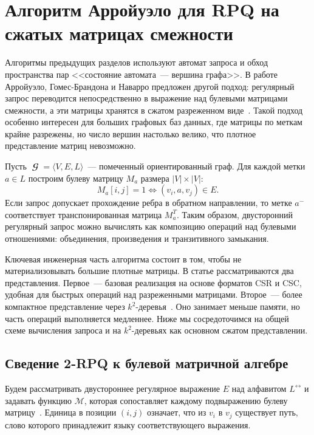 \section{Алгоритм Арройуэло для RPQ на сжатых матрицах смежности}
\label{sec:RPQ_Arroyuelo}

Алгоритмы предыдущих разделов используют автомат запроса и обход пространства пар <<состояние автомата~--- вершина графа>>. В работе Арройуэло, Гомес-Брандона и Наварро предложен другой подход: регулярный запрос переводится непосредственно в выражение над булевыми матрицами смежности, а эти матрицы хранятся в сжатом разреженном виде~. Такой подход особенно интересен для больших графовых баз данных, где матрицы по меткам крайне разрежены, но число вершин настолько велико, что плотное представление матриц невозможно.

Пусть $\mbfscrG = \langle V,E,L\rangle$~--- помеченный ориентированный граф. Для каждой метки $a \in L$ построим булеву матрицу $M_a$ размера $|V| \times |V|$:
\[
    M_a[i,j] = 1 \iff (v_i,a,v_j) \in E.
\]
Если запрос допускает прохождение ребра в обратном направлении, то метке $a^{-}$ соответствует транспонированная матрица $M_a^T$. Таким образом, двусторонний регулярный запрос можно вычислять как композицию операций над булевыми отношениями: объединения, произведения и транзитивного замыкания.

Ключевая инженерная часть алгоритма состоит в том, чтобы не материализовывать большие плотные матрицы. В статье рассматриваются два представления. Первое~--- базовая реализация на основе форматов CSR и CSC, удобная для быстрых операций над разреженными матрицами. Второе~--- более компактное представление через $k^2$-деревья~. Оно занимает меньше памяти, но часть операций выполняется медленнее. Ниже мы сосредоточимся на общей схеме вычисления запроса и на $k^2$-деревьях как основном сжатом представлении.

\subsection{Сведение 2-RPQ к булевой матричной алгебре}
\label{subsec:RPQ_Arroyuelo_translation}

Будем рассматривать двустороннее регулярное выражение $E$ над алфавитом $L^{\leftrightarrow}$ и задавать функцию $\mathcal{M}$, которая сопоставляет каждому подвыражению булеву матрицу~. Единица в позиции $(i,j)$ означает, что из $v_i$ в $v_j$ существует путь, слово которого принадлежит языку соответствующего выражения.

